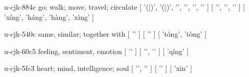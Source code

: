 \begin{multicols}{2}
\lettrine[lines=3]{\cjkgGlue{}}{}\begin{minipage}{0.8\linewidth} u-cjk-884c  go; walk; move, travel; circulate  [ '\cjkgGlue{}(\cjkgGlue{}|\cjkgGlue{})', '\cjkgGlue{}(\cjkgGlue{}|\cjkgGlue{})', '\cjkgGlue{}', '\cjkgGlue{}', '\cjkgGlue{}', '\cjkgGlue{}' ]  [ '\cjkgGlue{}', '\cjkgGlue{}', '\cjkgGlue{}' ]  [ 'xíng', 'háng', 'hàng', 'xìng' ] \end{minipage}

\lettrine[lines=3]{\cjkgGlue{}}{}\begin{minipage}{0.8\linewidth} u-cjk-540c  same, similar; together with  [ '\cjkgGlue{}' ]  [ '\cjkgGlue{}' ]  [ 'tóng', 'tòng' ] \end{minipage}

\lettrine[lines=3]{\cjkgGlue{}}{}\begin{minipage}{0.8\linewidth} u-cjk-60c5  feeling, sentiment, emotion  [ '\cjkgGlue{}' ]  [ '\cjkgGlue{}', '\cjkgGlue{}' ]  [ 'qíng' ] \end{minipage}

\lettrine[lines=3]{\cjkgGlue{}}{}\begin{minipage}{0.8\linewidth} u-cjk-5fc3  heart; mind, intelligence; soul  [ '\cjkgGlue{}', '\cjkgGlue{}' ]  [ '\cjkgGlue{}' ]  [ 'xīn' ] \end{minipage}


\end{multicols}
